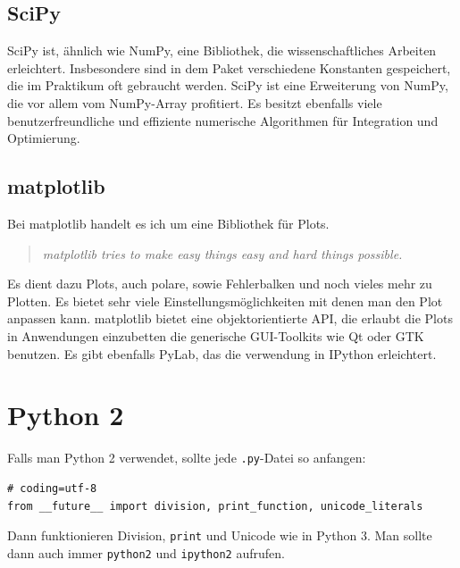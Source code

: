 \subsection{SciPy}
SciPy ist, ähnlich wie NumPy, eine Bibliothek, die wissenschaftliches Arbeiten erleichtert.
Insbesondere sind in dem Paket verschiedene Konstanten gespeichert, die im Praktikum oft gebraucht werden.
SciPy ist eine Erweiterung von NumPy, die vor allem vom NumPy-Array profitiert.
Es besitzt ebenfalls viele benutzerfreundliche und effiziente numerische Algorithmen für Integration und Optimierung.

\subsection{matplotlib}
Bei matplotlib handelt es ich um eine Bibliothek für Plots.
\begin{quote}
  \textit{matplotlib tries to make easy things easy and hard things possible.}
\end{quote}
Es dient dazu Plots, auch polare, sowie Fehlerbalken und noch vieles mehr zu Plotten.
Es bietet sehr viele Einstellungsmöglichkeiten mit denen man den Plot anpassen kann.
matplotlib bietet eine objektorientierte API, die erlaubt die Plots in Anwendungen einzubetten die generische GUI-Toolkits wie Qt oder GTK benutzen.
Es gibt ebenfalls PyLab, das die verwendung in IPython erleichtert.

\section{Python 2}
Falls man Python 2 verwendet, sollte jede \texttt{.py}-Datei so anfangen:
\begin{verbatim}
# coding=utf-8
from __future__ import division, print_function, unicode_literals
\end{verbatim}
Dann funktionieren Division, \texttt{print} und Unicode wie in Python 3.
Man sollte dann auch immer \texttt{python2} und \texttt{ipython2} aufrufen.


